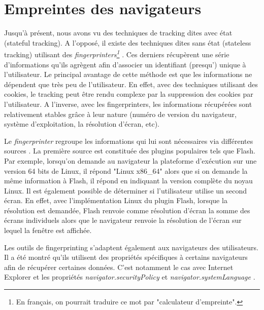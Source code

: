 \section{Empreintes des navigateurs}
\label{fingerprinters}
Jusqu'à présent, nous avons vu des techniques de tracking dites avec état (stateful tracking). A l'opposé, il existe des techniques dites sans état (stateless tracking) utilisant des \textit{fingerprinters\footnote{En français, on pourrait traduire ce mot par "calculateur d'empreinte".}} \cite{Mayer:2012:TWT:2310656.2310703}. Ces derniers récupèrent une série d'informations qu'ils agrègent afin d'associer un identifiant (presqu') unique à l'utilisateur. Le principal avantage de cette méthode est que les informations ne dépendent que très peu de l'utilisateur.
En effet, avec des techniques utilisant des cookies, le tracking peut être rendu complexe par la suppression des cookies par l'utilisateur. A l'inverse, avec les fingerprinters, les informations récupérées sont relativement stables grâce à leur nature (numéro de version du navigateur, système d'exploitation, la résolution d'écran, etc).
\newline

Le \textit{fingerprinter} regroupe les informations qui lui sont nécessaires via différentes sources \cite{Nikiforakis:2013:CME:2497621.2498133}. La première source est constituée des plugins populaires tels que Flash. Par exemple, lorsqu'on demande au navigateur la plateforme d'exécution sur une version 64 bits de Linux, il répond "Linux x86\_64" alors que si on demande la même information à Flash, il répond en indiquant la version complète du noyau Linux. Il est également possible de déterminer si l'utilisateur utilise un second écran. En effet, avec l'implémentation Linux du plugin Flash, lorsque la résolution est demandée, Flash renvoie comme résolution d'écran la somme des écrans individuels alors que le navigateur renvoie la résolution de l'écran sur lequel la fenêtre est affichée.

Les outils de fingerprinting s'adaptent également aux navigateurs des utilisateurs. Il a été montré qu'ils utilisent des propriétés spécifiques à certains navigateurs afin de récupérer certaines données. C'est notamment le cas avec Internet Explorer et les propriétés \textit{navigator.securityPolicy} et \textit{navigator.systemLanguage} \cite{Nikiforakis:2013:CME:2497621.2498133}.

